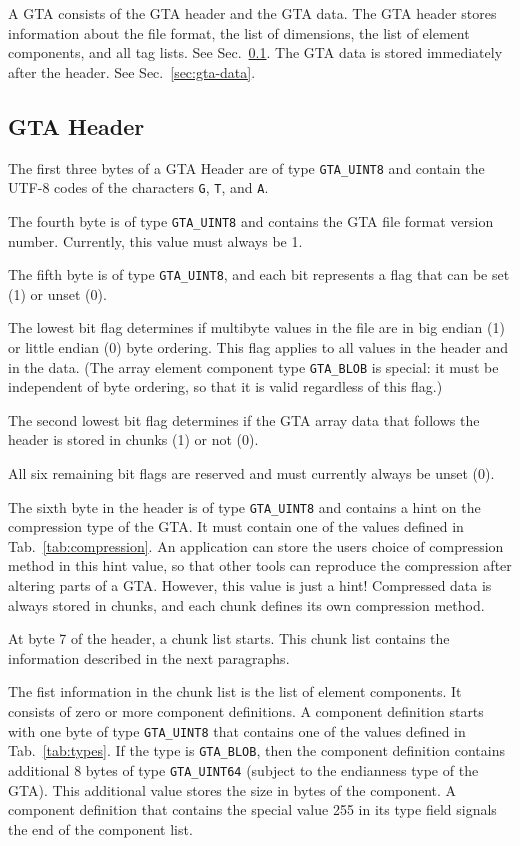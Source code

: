 \documentclass[a4paper,11pt]{article}
\newcommand{\code}[1]{\texttt{#1}}
\begin{document}
A GTA consists of the GTA header and the GTA data. The GTA header stores
information about the file format, the list of dimensions, the list of element
components, and all tag lists. See Sec.~\ref{sec:gta-header}.
The GTA data is stored immediately after the header. See Sec.~\ref{sec:gta-data}.


\subsection{GTA Header}
\label{sec:gta-header}

The first three bytes of a GTA Header are of type \code{GTA\_UINT8} and contain
the \mbox{UTF-8} codes of the characters \code{G}, \code{T}, and \code{A}.

The fourth byte is of type \code{GTA\_UINT8} and contains the GTA file format
version number. Currently, this value must always be 1.

The fifth byte is of type \code{GTA\_UINT8}, and each bit represents a flag that
can be set (1) or unset (0).

The lowest bit flag determines if multibyte values in the file are in big endian
(1) or little endian (0) byte ordering. This flag applies to all values in the
header and in the data. (The array element component type \code{GTA\_BLOB} is special:
it must be independent of byte ordering, so that it is valid regardless of this
flag.)

The second lowest bit flag determines if the GTA array data that follows the header 
is stored in chunks (1) or not (0).

All six remaining bit flags are reserved and must currently always be unset (0).

The sixth byte in the header is of type \code{GTA\_UINT8} and contains a hint on
the compression type of the GTA. It must contain one of the values defined in
Tab.~\ref{tab:compression}.  An application can store the users choice of
compression method in this hint value, so that other tools can reproduce the
compression after altering parts of a GTA. However, this value is just a hint!
Compressed data is always stored in chunks, and each chunk defines its own
compression method.

At byte 7 of the header, a chunk list starts. This chunk list contains the
information described in the next paragraphs.

The fist information in the chunk list is the list of element components. It
consists of zero or more component definitions. A component definition starts
with one byte of type \code{GTA\_UINT8} that contains one of the values
defined in Tab.~\ref{tab:types}. If the type is \code{GTA\_BLOB}, then the
component definition contains additional 8 bytes of type \code{GTA\_UINT64}
(subject to the endianness type of the GTA). This additional value stores the
size in bytes of the component. A component definition that contains the
special value 255 in its type field signals the end of the component list.
\end{document}
